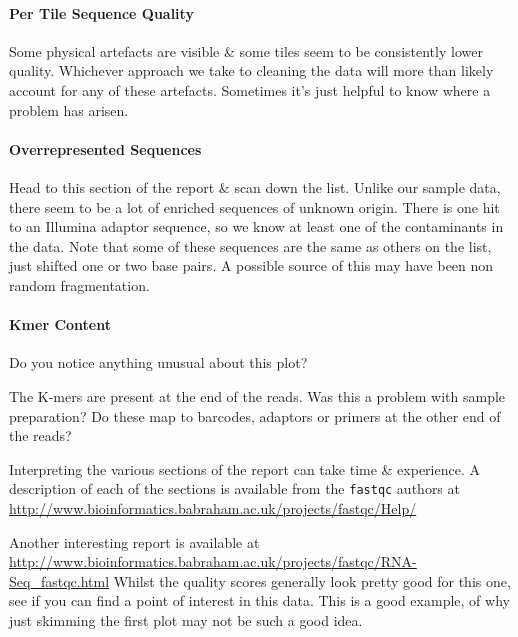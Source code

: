 \paragraph{Per Tile Sequence Quality}
Some physical artefacts are visible \& some tiles seem to be consistently lower quality.
Whichever approach we take to cleaning the data will more than likely account for any of these artefacts.
Sometimes it's just helpful to know where a problem has arisen.

\paragraph{Overrepresented Sequences}
Head to this section of the report \& scan down the list.
Unlike our sample data, there seem to be a lot of enriched sequences of unknown origin.
There is one hit to an Illumina adaptor sequence, so we know at least one of the contaminants in the data.
Note that some of these sequences are the same as others on the list, just shifted one or two base pairs.
A possible source of this may have been non random fragmentation.

\paragraph{Kmer Content}
\begin{questions}
Do you notice anything unusual about this plot?\\
\begin{answer}
The K-mers are present at the end of the reads.
Was this a problem with sample preparation? 
Do these map to barcodes, adaptors or primers at the other end of the reads? \\
\end{answer}
\end{questions}

\begin{information}
Interpreting the various sections of the report can take time \& experience.
A description of each of the sections is available from the \texttt{fastqc} authors at \url{http://www.bioinformatics.babraham.ac.uk/projects/fastqc/Help/}
\end{information}

\begin{bonus}
Another interesting report is available at \url{http://www.bioinformatics.babraham.ac.uk/projects/fastqc/RNA-Seq\_fastqc.html}
Whilst the quality scores generally look pretty good for this one, see if you can find a point of interest in this data.
This is a good example, of why just skimming the first plot may not be such a good idea.
\end{bonus}

